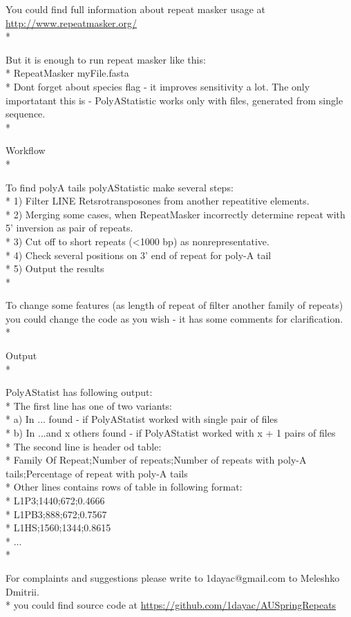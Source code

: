 \documentclass[12pt]{article}
\begin{document}
You could find full information about repeat masker usage at \href{http://www.repeatmasker.org/}{http://www.repeatmasker.org/}  \\*

But it is enough to run repeat masker like this: \\* 
RepeatMasker myFile.fasta \\*
Dont forget about species flag - it improves sensitivity a lot. The only importatant this is - PolyAStatistic works only with files, generated from single sequence. \\*

\begin{Large}
Workflow \\*
\end{Large}
To find polyA tails polyAStatistic make several steps: \\*
1) Filter LINE Retsrotransposones from another repeatitive elements. \\*
2) Merging some cases, when RepeatMasker incorrectly determine repeat with 5' inversion as pair of repeats. \\*
3) Cut off to short repeats (<1000 bp) as nonrepresentative. \\*
4) Check several positions on 3' end of repeat for poly-A tail \\*
5) Output the results \\*

To change some features (as length of repeat of filter another family of repeats) you could change the code as you wish - it has some comments for clarification. \\*

\begin{Large}
Output \\*
\end{Large}
PolyAStatist has following output: \\*
The first line has one of two variants: \\*
a) In ... found - if PolyAStatist worked with single pair of files \\*
b) In ...and x others found - if PolyAStatist worked with x + 1 pairs of files \\*
The second line is header od table: \\*
Family Of Repeat;Number of repeats;Number of repeats with poly-A tails;Percentage of repeat with poly-A tails \\*
Other lines contains rows of table in following format: \\*
L1P3;1440;672;0.4666\\*
L1PB3;888;672;0.7567\\*
L1HS;1560;1344;0.8615\\*
...\\*

For complaints and suggestions please write to 1dayac@gmail.com to Meleshko Dmitrii.\\*
you could find source code at \href{https://github.com/1dayac/AUSpringRepeats}{https://github.com/1dayac/AUSpringRepeats}
\end{document}
